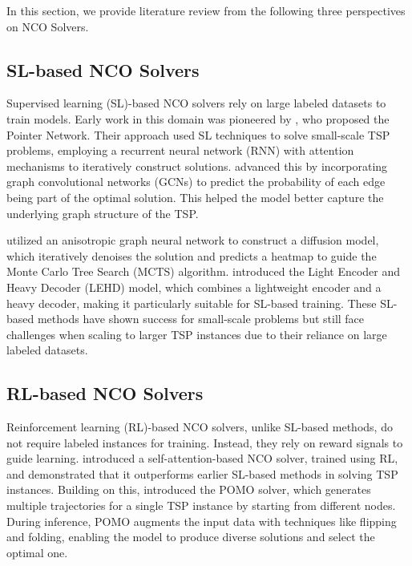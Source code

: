  In this section, we provide literature review from the following three perspectives on NCO Solvers. %
 
\subsection{SL-based NCO Solvers}
Supervised learning (SL)-based NCO solvers rely on large labeled datasets to train models.  
Early work in this domain was pioneered by \citet{vinyals2015pointer}, who proposed the Pointer Network.  Their approach used SL techniques to solve small-scale TSP problems, employing a recurrent neural network (RNN) with attention mechanisms to iteratively construct solutions. 
\citet{joshi2019efficient} advanced this by incorporating graph convolutional networks (GCNs) \cite{kipf2016semi} to predict the probability of each edge being part of the optimal solution. This helped the model better capture the underlying graph structure of the TSP. 

\citet{sun2023difusco} utilized an anisotropic graph neural network \cite{bresson2018experimental} to construct a diffusion model, which iteratively denoises the solution and predicts a heatmap to guide the Monte Carlo Tree Search (MCTS) algorithm. 
\citet{luo2023neural} introduced the Light
Encoder and Heavy Decoder (LEHD) model, which combines a lightweight encoder and a heavy decoder, making it particularly suitable for SL-based training. 
These SL-based methods have shown success for small-scale problems but still face challenges when scaling to larger TSP instances due to their reliance on large labeled datasets. 

\subsection{RL-based NCO Solvers}
Reinforcement learning (RL)-based NCO solvers, unlike SL-based methods, do not require labeled instances for training. 
Instead, they rely on reward signals to guide learning.  
\citet{kool2018attention} introduced a self-attention-based \cite{vaswani2017attention} NCO solver,  trained using RL, and demonstrated that it outperforms earlier SL-based methods in solving TSP instances. 
Building on this, \citet{kwon2020pomo} introduced the POMO solver, which generates multiple trajectories for a single TSP instance by starting from different nodes. 
During inference, POMO augments the input data with techniques like flipping and folding, enabling the model to produce diverse solutions and select the optimal one.  

